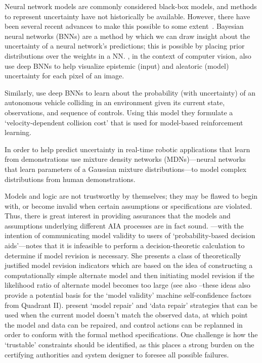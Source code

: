 Neural network models are commonly considered black-box models, and methods to represent uncertainty have not historically be available. However, there have been several recent advances to make this possible to some extent~\cite{Gal2016-om,Gal2016-eq}. Bayesian neural networks (BNNs) are a method by which we can draw insight about the uncertainty of a neural network's predictions; this is possible by placing prior distributions over the weights in a NN. \citet{Kendall2017-ry}, in the context of computer vision, also use deep BNNs to help visualize epistemic (input) and aleatoric (model) uncertainty for each pixel of an image.

Similarly, \citet{Kahn2017-vy} use deep BNNs to learn about the probability (with uncertainty) of an autonomous vehicle colliding in an environment given its current state, observations, and sequence of controls. Using this model they formulate a `velocity-dependent collision cost' that is used for model-based reinforcement learning.

In order to help predict uncertainty in real-time robotic applications that learn from demonstrations \citet{Choi2017-th} use mixture density networks (MDNs)---neural networks that learn parameters of a Gaussian mixture distributions---to model complex distributions from human demonstrations.

Models and logic are not trustworthy by themselves; they may be flawed to begin with, or become invalid when certain assumptions or specifications are violated. Thus, there is great interest in providing assurances that the models and assumptions underlying different AIA processes are in fact sound. \citet{Laskey1991-mf}---with the intention of communicating model validity to users of `probability-based decision aids'---notes that it is infeasible to perform a decision-theoretic calculation to determine if model revision is necessary. She presents a class of theoretically justified model revision indicators which are based on the idea of constructing a computationally simple alternate model and then initiating model revision if the likelihood ratio of alternate model becomes too large (see also \citet{Zagorecki2015-qy,Habbema1976-xd} --these ideas also provide a potential basis for the `model validity' machine self-confidence factors from Quadrant II). \citet{Ghosh2016-dl}  present `model repair' and `data repair' strategies that can be used when the current model doesn't match the observed data, at which point the model and data can be repaired, and control actions can be replanned in order to conform with the formal method specifications. One challenge is how the `trustable' constraints should be identified, as this places a strong burden on the certifying authorities and system designer to foresee all possible failures.
